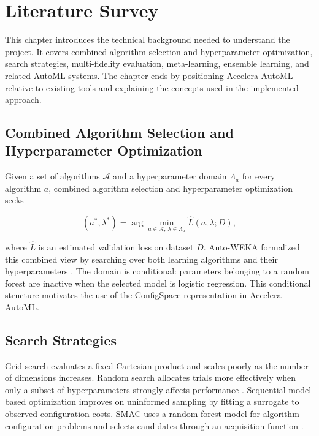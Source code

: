 \documentclass[12pt,a4paper,oneside]{report}
\newcommand{\systemname}{Accelera AutoML}
\begin{document}
\chapter{Literature Survey}
\label{chap:literature}

This chapter introduces the technical background needed to understand the
project. It covers combined algorithm selection and hyperparameter
optimization, search strategies, multi-fidelity evaluation, meta-learning,
ensemble learning, and related AutoML systems. The chapter ends by positioning
\systemname{} relative to existing tools and explaining the concepts used in
the implemented approach.

\section{Combined Algorithm Selection and Hyperparameter Optimization}

Given a set of algorithms $\mathcal{A}$ and a hyperparameter domain
$\Lambda_a$ for every algorithm $a$, combined algorithm selection and
hyperparameter optimization seeks

\begin{equation}
  (a^*, \lambda^*) =
  \arg\min_{a \in \mathcal{A},\,\lambda \in \Lambda_a}
  \widehat{L}(a, \lambda; D),
\end{equation}

\medskip
\noindent where $\widehat{L}$ is an estimated validation loss on dataset $D$. Auto-WEKA
formalized this combined view by searching over both learning algorithms and
their hyperparameters \cite{autoweka}. The domain is conditional: parameters
belonging to a random forest are inactive when the selected model is logistic
regression. This conditional structure motivates the use of the ConfigSpace
representation in \systemname{}.

\section{Search Strategies}

Grid search evaluates a fixed Cartesian product and scales poorly as the
number of dimensions increases. Random search allocates trials more effectively
when only a subset of hyperparameters strongly affects performance
\cite{randomsearch}. Sequential model-based optimization improves on uninformed
sampling by fitting a surrogate to observed configuration costs. SMAC uses a
random-forest model for algorithm configuration problems and selects candidates
through an acquisition function \cite{smac}.
\end{document}
